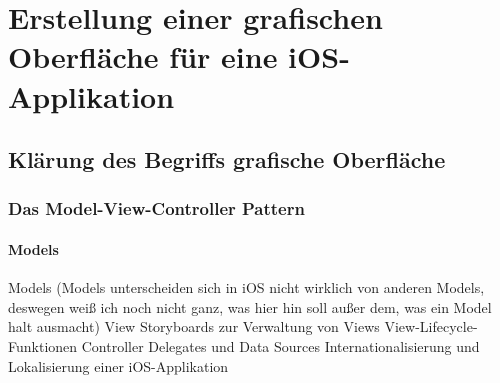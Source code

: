 %
\section{Erstellung einer grafischen Oberfläche für eine iOS-Applikation}

\subsection{Klärung des Begriffs \glqq grafische Oberfläche\grqq}
\subsubsection{Das Model-View-Controller Pattern}
\paragraph{Models}


Models
(Models unterscheiden sich in iOS nicht wirklich von anderen Models, deswegen weiß ich noch nicht ganz, was hier hin soll außer dem, was ein Model halt ausmacht)
View
Storyboards zur Verwaltung von Views
View-Lifecycle-Funktionen
Controller
Delegates und Data Sources
Internationalisierung und Lokalisierung einer iOS-Applikation